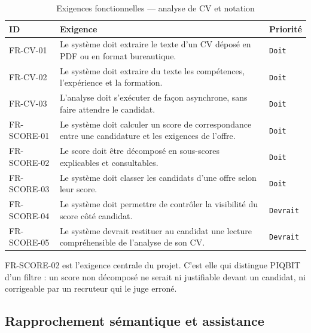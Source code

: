 \begin{table}[htbp]
  \centering
  \caption{Exigences fonctionnelles — analyse de CV et notation}
  \label{tab:fr_scoring}
  \begin{tabularx}{\textwidth}{L{2.4cm} X L{1.9cm}}
    \toprule
    \textbf{ID} & \textbf{Exigence} & \textbf{Priorité} \\
    \midrule
    FR-CV-01    & Le système doit extraire le texte d'un CV déposé en PDF ou en format bureautique. & \texttt{Doit} \\
    FR-CV-02    & Le système doit extraire du texte les compétences, l'expérience et la formation. & \texttt{Doit} \\
    FR-CV-03    & L'analyse doit s'exécuter de façon asynchrone, sans faire attendre le candidat. & \texttt{Doit} \\
    FR-SCORE-01 & Le système doit calculer un score de correspondance entre une candidature et les exigences de l'offre. & \texttt{Doit} \\
    FR-SCORE-02 & Le score doit être décomposé en sous-scores explicables et consultables. & \texttt{Doit} \\
    FR-SCORE-03 & Le système doit classer les candidats d'une offre selon leur score. & \texttt{Doit} \\
    FR-SCORE-04 & Le système doit permettre de contrôler la visibilité du score côté candidat. & \texttt{Devrait} \\
    FR-SCORE-05 & Le système devrait restituer au candidat une lecture compréhensible de l'analyse de son CV. & \texttt{Devrait} \\
    \bottomrule
  \end{tabularx}
\end{table}

FR-SCORE-02 est l'exigence centrale du projet. C'est elle qui distingue PIQBIT
d'un filtre : un score non décomposé ne serait ni justifiable devant un
candidat, ni corrigeable par un recruteur qui le juge erroné.

\subsection{Rapprochement sémantique et assistance}
\label{sec:fr_semantic}


